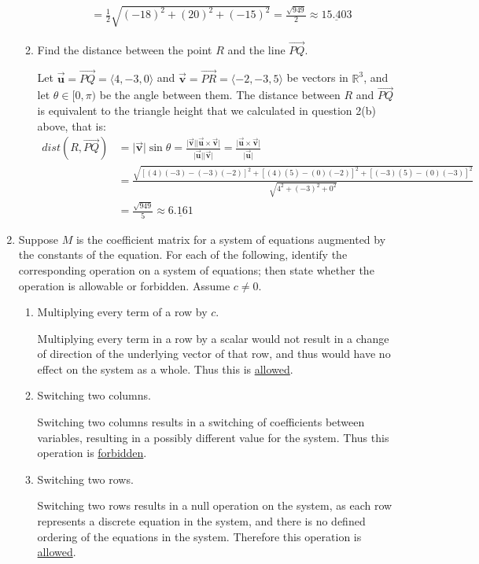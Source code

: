 \documentclass{letter}
\newcounter{question}
\newcommand{\norm}[1]{\lvert #1 \rvert}
\newcommand{\Ve}[1]{\langle #1 \rangle}
\newcommand{\Vn}[1]{\vec{\bm{#1}}}
\newcommand\Que[1]{%
   \leavevmode\noindent
   #1
}
\newcommand\Ans[2][]{%
   \leavevmode\noindent
   {
       \begin{mdframed}[backgroundcolor=blue!10]
       #2
       \end{mdframed}
   }
}
\begin{document}
\begin{enumerate}
\begin{enumerate}[label=(\alph*)]
{\begin{align*}
            &= \frac{1}{2}\sqrt{(-18)^2 + (20)^2 + (-15)^2}
            = \frac{\sqrt{949}}{2}
            \approx \underline{15.403}
        \end{align*}
    }
    \item \Que{Find the distance between the point $R$ and the line $\overrightarrow{PQ}$.}
    \Ans{
        Let $\Vn{u} = \overrightarrow{PQ} = \Ve{ 4,-3,0}$ 
        and $\Vn{v} = \overrightarrow{PR} = \Ve{ -2,-3, 5 }$ 
        be vectors in $\mathbb{R}^3$, and let $\theta \in [0,\pi)$ be the angle between them.  
        The distance between $R$ and $\overrightarrow{PQ}$ is equivalent
        to the triangle height that we calculated in question 2(b) above, that is:
        \begin{align*}
            dist(R, \overrightarrow{PQ}) &= \norm{\Vn{v}}\sin{\theta}
            = \frac{\norm{\Vn{v}}\norm{\Vn{u}\times\Vn{v}}}{\norm{\Vn{u}}\norm{\Vn{v}}}
            = \frac{\norm{\Vn{u}\times\Vn{v}}}{\norm{\Vn{u}}}\\
            &= \frac{\sqrt{[(4)(-3) - (-3)(-2)]^2+[(4)(5)-(0)(-2)]^2 + [(-3)(5)-(0)(-3)]^2}}
                    {\sqrt{4^2+(-3)^2+0^2}}\\
            &= \frac{\sqrt{949}}{5}
            \approx \underline{6.161}
        \end{align*}
    }
    \end{enumerate}
    \newpage
    \item Suppose $M$ is the coefficient matrix for a system of equations augmented by the constants of the equation.  For each of the following, identify the corresponding operation on a system of equations; then state whether the operation is allowable or forbidden.  Assume $c \not = 0$.
    \begin{enumerate}[label=(\alph*)]
    \item \Que{Multiplying every term of a row by $c$.}
    \Ans{
    Multiplying every term in a row by a scalar would not result in a change of direction of the underlying vector of that row, and thus would have no effect on the system as a whole.  Thus this is \underline{allowed}.
    }
    \item \Que{Switching two columns.}
    \Ans{
    Switching two columns results in a switching of coefficients between variables, resulting in a possibly different value for the system.  Thus this operation is \underline{forbidden}.
    }
    \item \Que{Switching two rows.}
    \Ans{
    Switching two rows results in a null operation on the system, as each row represents a discrete equation in the system, and there is no defined ordering of the equations in the system.  Therefore this operation is \underline{allowed}.
}
\end{enumerate}
\end{enumerate}
\end{document}
